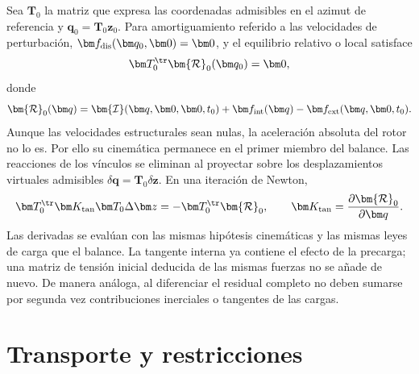 Sea $\bm T_0$ la matriz que expresa las coordenadas admisibles en el azimut de referencia y $\bm q_0=\bm T_0\bm z_0$. Para amortiguamiento referido a las velocidades de perturbación, $\bm f_{\rm dis}(\bm q_0,\bm0)=\bm0$, y el equilibrio relativo o local satisface
\begin{equation}
\bm T_0^\tr\bm{\mathcal R}_0(\bm q_0)=\bm0,
\label{eq:equilibrium}
\end{equation}
donde
\begin{equation}
\bm{\mathcal R}_0(\bm q)=
\bm{\mathcal I}(\bm q,\bm0,\bm0,t_0)
+\bm f_{\rm int}(\bm q)-\bm f_{\rm ext}(\bm q,\bm0,t_0).
\end{equation}
Aunque las velocidades estructurales sean nulas, la aceleración absoluta del rotor no lo es. Por ello su cinemática permanece en el primer miembro del balance. Las reacciones de los vínculos se eliminan al proyectar sobre los desplazamientos virtuales admisibles $\delta\bm q=\bm T_0\delta\bm z$. En una iteración de Newton,
\begin{equation}
\bm T_0^\tr\bm K_{\rm tan}\bm T_0\Delta\bm z
=-\bm T_0^\tr\bm{\mathcal R}_0,\qquad
\bm K_{\rm tan}=\frac{\partial\bm{\mathcal R}_0}{\partial\bm q}.
\end{equation}
Las derivadas se evalúan con las mismas hipótesis cinemáticas y las mismas leyes de carga que el balance. La tangente interna ya contiene el efecto de la precarga; una matriz de tensión inicial deducida de las mismas fuerzas no se añade de nuevo. De manera análoga, al diferenciar el residual completo no deben sumarse por segunda vez contribuciones inerciales o tangentes de las cargas.

\section{Transporte y restricciones}
\label{sec:transporte}
